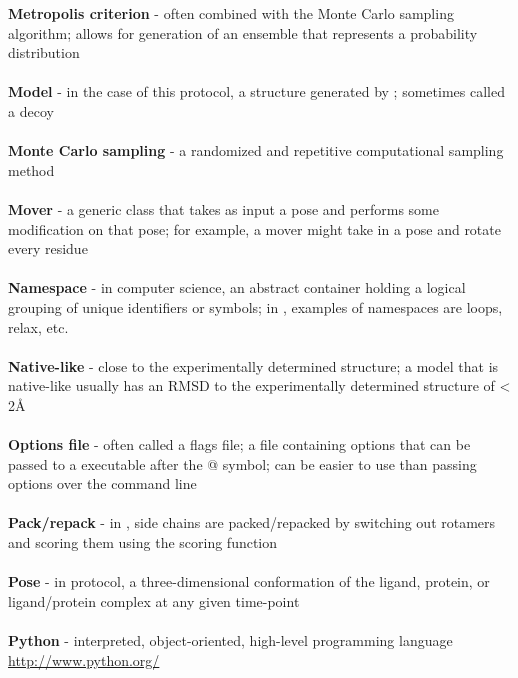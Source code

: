 \textbf{Metropolis criterion} - often combined with the Monte Carlo sampling algorithm; allows for generation of an ensemble that represents a probability distribution \\ \\

\textbf{Model} - in the case of this protocol, a structure generated by \rosetta; sometimes called a decoy \\ \\

\textbf{Monte Carlo sampling} - a randomized and repetitive computational sampling method \\ \\

\textbf{Mover} - a generic class that takes as input a pose and performs some modification on that pose; for example, a mover might take in a pose and rotate every residue \\ \\

\textbf{Namespace} - in computer science, an abstract container holding a logical grouping of unique identifiers or symbols; in \rosetta, examples of namespaces are loops, relax, etc. \\ \\

\textbf{Native-like} - close to the experimentally determined structure; a model that is native-like usually has an RMSD to the experimentally determined structure of < 2\r{A} \\ \\

\textbf{Options file} - often called a flags file; a file containing \rosetta options that can be passed to a \rosetta executable after the @ symbol; can be easier to use than passing \rosetta options over the command line \\ \\

\textbf{Pack/repack} - in \rosetta, side chains are packed/repacked by switching out rotamers and scoring them using the \rosetta scoring function \\ \\

\textbf{Pose} - in  \rosetta protocol, a three-dimensional conformation of the ligand, protein, or ligand/protein complex at any given time-point \\ \\

\textbf{Python} - interpreted, object-oriented, high-level programming language \url{http://www.python.org/} \\ \\

